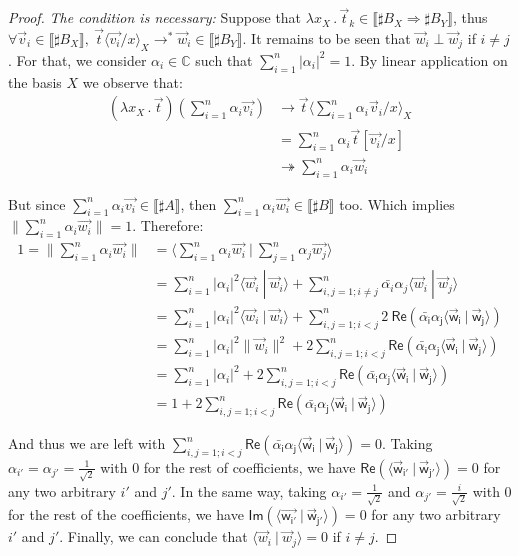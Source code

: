 \documentclass[runningheads,orivec,envcountsame,envcountsect]{llncs}
\newcommand\Rpart[1]{\mathsf{Re(#1)}}
\newcommand\Ipart[1]{\mathsf{Im(#1)}}
\newcommand\lra{\longrightarrow}
\newcommand\ansubst[2]{\ensuremath{\langle #1 \rangle_{#2}}}
\def\C{\mathbb{C}}            %
\def\scal#1#2{\langle{#1}~|~{#2}\rangle}
\def\Lam#1#2#3{\lambda#1_{#2}\,{.}\,#3} %
\def\eval{\lra^*}
\def\Arr{\Rightarrow}
\def\sem#1{\llbracket#1\rrbracket}
\newcommand\basis[1]{\ensuremath{B_{ #1 }}}
\begin{document}
\begin{proof}
  \textit{The condition is necessary:} Suppose that $\Lam{x}{X}{\vec t_k}\in\sem{\sharp\basis{X}\Arr\sharp\basis{Y}}$, thus $\forall \vec v_i\in\sem{\sharp\basis{X}},\ \vec{t}\ansubst{\vec{v_i}/x}{X}\eval\vec w_i\in\sem{\sharp\basis{Y}}$. It remains to be seen that $\vec w_i \perp \vec w_j$ if $i\neq j$. For that, we consider $\alpha_i\in\C$ such that $\sum_{i=1}^n |\alpha_i|^2 = 1$. By linear application on the basis $X$ we observe that:
  \begin{align*}
    (\Lam{x}{X}{\vec{t}})(\sum_{i=1}^n \alpha_i \vec{v_i}) &\to \vec t\ansubst{\sum_{i=1}^n \alpha_i \vec v_i/x}{X}\\
    &= \sum_{i=1}^{n} \alpha_i \vec{t}[\vec{v_i}/x]\\ 
    &\twoheadrightarrow \sum_{i=1}^n \alpha_i \vec w_i
  \end{align*}

  But since $\sum_{i=1}^n \alpha_i \vec{v_i}\in\sem{\sharp A}$, then $\sum_{i=1}^n \alpha_i \vec{w_i}\in\sem{\sharp B}$ too. Which implies $\|\sum_{i=1}^n \alpha_i \vec{w_i}\|=1$. Therefore:
  \begin{align*}
    1 = \|\sum_{i=1}^n \alpha_i \vec{w_i}\| &= \scal{\sum_{i=1}^n \alpha_i \vec{w_i}}{\sum_{j=1}^n \alpha_j \vec{w_j}}\\
    &=\sum_{i=1}^n |\alpha_i|^2 \scal{\vec w_i}{\vec w_i } + \sum_{i,j=1; i\neq j}^n \bar{\alpha_i}\alpha_j \scal{\vec w_i}{\vec w_j}\\
    &=\sum_{i=1}^n |\alpha_i|^2 \scal{\vec w_i}{\vec w_i } + \sum_{i,j=1; i<j}^n 2~\Rpart{\bar{\alpha_i}\alpha_j \scal{\vec w_i}{\vec w_j}}\\
    &=\sum_{i=1}^n |\alpha_i|^2 \|\vec w_i\|^2 + 2\sum_{i,j=1; i<j}^n \Rpart{\bar{\alpha_i}\alpha_j \scal{\vec w_i}{\vec w_j}}\\
    &=\sum_{i=1}^n |\alpha_i|^2 + 2\sum_{i,j=1; i<j}^n\Rpart{\bar{\alpha_i}\alpha_j \scal{\vec w_i}{\vec w_j}}\\
    &= 1 + 2\sum_{i,j=1; i<j}^n \Rpart{\bar{\alpha_i}\alpha_j \scal{\vec w_i}{\vec w_j}}
  \end{align*}

  And thus we are left with $\sum_{i,j=1; i<j}^n \Rpart{\bar{\alpha_i}\alpha_j \scal{\vec w_i}{\vec w_j}} = 0$. Taking $\alpha_{i'} = \alpha_{j'} = \frac{1}{\sqrt{2}}$ with $0$ for the rest of coefficients, we have $\Rpart{\scal{\vec w_{i'}}{\vec w_{j'}}} = 0$ for any two arbitrary $i'$ and $j'$. In the same way, taking $\alpha_{i'} = \frac{1}{\sqrt{2}}$ and $\alpha_{j'}=\frac{i}{\sqrt{2}}$ with $0$ for the rest of the coefficients, we have $\Ipart{\scal{\vec{w_{i'}}}{\vec w_{j'}}} = 0$ for any two arbitrary $i'$ and $j'$. Finally, we can conclude that $\scal{\vec w_i}{\vec w_j}=0$ if $i\neq j$.


\end{proof}
\end{document}
